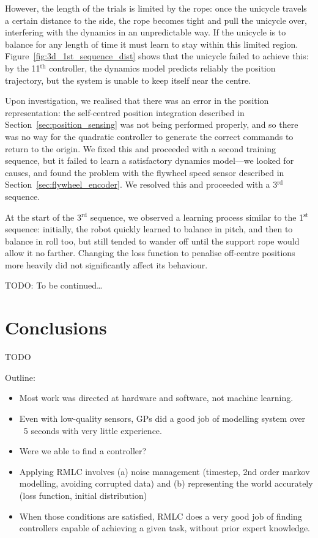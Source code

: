 \documentclass{IIBproject}
\begin{document}
However, the length of the trials is limited by the rope: once the unicycle
travels a certain distance to the side, the rope becomes tight and pull the
unicycle over, interfering with the dynamics in an unpredictable way. If the
unicycle is to balance for any length of time it must learn to stay within
this limited region. Figure~\ref{fig:3d_1st_sequence_dist} shows that the
unicycle failed to achieve this: by the 11$^\textrm{th}$ controller, the
dynamics model predicts reliably the position trajectory, but the system is
unable to keep itself near the centre.

Upon investigation, we realised that there was an error in the position
representation: the self-centred position integration described in
Section~\ref{sec:position_sensing} was not being performed properly, and so
there was no way for the quadratic controller to generate the correct commands
to return to the origin. We fixed this and proceeded with a second training
sequence, but it failed to learn a satisfactory dynamics model---we looked for
causes, and found the problem with the flywheel speed sensor described in
Section~\ref{sec:flywheel_encoder}. We resolved this and proceeded with a
3$^\textrm{rd}$ sequence.

At the start of the 3$^\textrm{rd}$ sequence, we observed a learning process
similar to the 1$^\textrm{st}$ sequence: initially, the robot quickly learned
to balance in pitch, and then to balance in roll too, but still tended to
wander off until the support rope would allow it no farther. Changing the loss
function to penalise off-centre positions more heavily did not significantly
affect its behaviour. 

TODO: To be continued\dots

\section{Conclusions}

TODO

Outline:

\begin{itemize}
  \item Most work was directed at hardware and software, not machine learning.
  \item Even with low-quality sensors, GPs did a good job of modelling system
    over ~5 seconds with very little experience.
  \item Were we able to find a controller?
  \item Applying RMLC involves (a) noise management (timestep, 2nd order
    markov modelling, avoiding corrupted data) and (b) representing the world
    accurately (loss function, initial distribution)
  \item When those conditions are satisfied, RMLC does a very good job of
    finding controllers capable of achieving a given task, without prior
    expert knowledge.
    \end{itemize}
\end{document}
